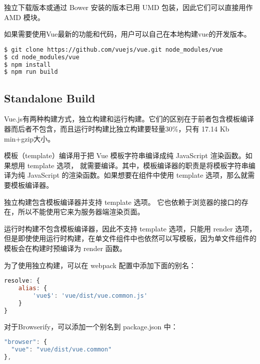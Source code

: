 独立下载版本或通过 Bower 安装的版本已用 UMD 包装，因此它们可以直接用作 AMD 模块。



如果需要使用Vue最新的功能和代码，用户可以自己在本地构建vue的开发版本。


\begin{lstlisting}[language=bash]
$ git clone https://github.com/vuejs/vue.git node_modules/vue
$ cd node_modules/vue
$ npm install
$ npm run build
\end{lstlisting}


\subsection{Standalone Build}


Vue.js有两种构建方式，独立构建和运行构建。它们的区别在于前者包含模板编译器而后者不包含，而且运行时构建比独立构建要轻量30\%，只有 17.14 Kb min+gzip大小。


模板（template）编译用于把 Vue 模板字符串编译成纯 JavaScript 渲染函数。如果想用 template 选项， 就需要编译。其中，模板编译器的职责是将模板字符串编译为纯 JavaScript 的渲染函数。如果想要在组件中使用 template 选项，那么就需要模板编译器。


\begin{compactitem}
\item 独立构建包含模板编译器并支持 template 选项。 它也依赖于浏览器的接口的存在，所以不能使用它来为服务器端渲染页面。
\item 运行时构建不包含模板编译器，因此不支持 template 选项，只能用 render 选项，但是即使使用运行时构建，在单文件组件中也依然可以写模板，因为单文件组件的模板会在构建时预编译为 render 函数。
\end{compactitem}






为了使用独立构建，可以在 webpack 配置中添加下面的别名：

\begin{lstlisting}[language=JavaScript]
resolve: {
    alias: {
        'vue$': 'vue/dist/vue.common.js'
    }
}
\end{lstlisting}

对于Browserify，可以添加一个别名到 package.json 中：

\begin{lstlisting}[language=JavaScript]
"browser": {
  "vue": "vue/dist/vue.common"
},
\end{lstlisting}



